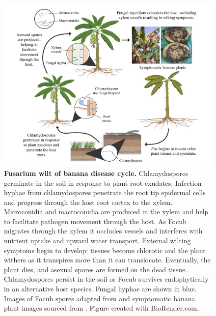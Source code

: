 \begin{figure}[p!]
    \includegraphics[width=16cm]{Figures/MyLifeCylceNarrow.pdf}
    \caption[Fusarium wilt of banana disease cycle.]{\textbf{Fusarium wilt of banana disease cycle.} Chlamydospores germinate in the soil in response to plant root exudates. Infection hyphae from chlamydospores penetrate the root tip epidermal cells and progress through the host root cortex to the xylem. Microconidia and macroconidia are produced in the xylem and help to facilitate pathogen movement through the host. As \acl{Focub} migrates through the xylem it occludes vessels and interferes with nutrient uptake and upward water transport. External wilting symptoms begin to develop; tissues become chlorotic and the plant withers as it transpires more than it can translocate. Eventually, the plant dies, and asexual spores are formed on the dead tissue. Chlamydospores persist in the soil or \acl{Focub}  survives endophytically in an alternative host species. Fungal hyphae are shown in blue. Images of \acl{Focub}  spores adapted from \textcite{Fourie2011} and symptomatic banana plant images sourced from \textcite{Maymon2020}. Figure created with BioRender.com.}
    \label{fig:MyLifeCycle}
\end{figure}

